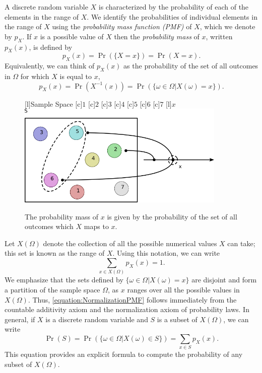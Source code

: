 A discrete random variable $X$ is characterized by the probability of each of the elements in the range of $X$.
We identify the probabilities of individual elements in the range of $X$ using the \emph{probability mass function (PMF)} of $X$, which we denote by $p_X$. 
If $x$ is a possible value of $X$ then the \emph{probability mass} of $x$, written $p_X (x)$, is defined by
\begin{equation} \label{equation:PMF}
p_X (x) = \Pr ( \{ X = x \} ) = \Pr ( X = x ) .
\end{equation}
Equivalently, we can think of $p_X (x)$ as the probability of the set of all outcomes in $\Omega$ for which $X$ is equal to $x$,
\begin{equation*}
p_X (x)
= \Pr (  X^{-1} (x)  )
= \Pr ( \{ \omega \in \Omega | X(\omega) = x \} ) .
\end{equation*}

\begin{figure}[ht]
\begin{center}
\begin{psfrags}
[l]{Sample Space}
[c]{$1$}
[c]{$2$}
[c]{$3$}
[c]{$4$}
[c]{$5$}
[c]{$6$}
[c]{$7$}
[l]{$x$}
\includegraphics[height=4.92cm]{Figures/5Chapter/pmf}
\caption{The probability mass of $x$ is given by the probability of the set of all outcomes which $X$ maps to $x$.}
\end{psfrags}
\end{center}
\end{figure}


Let $X(\Omega)$ denote the collection of all the possible numerical values $X$ can take; this set is known as the range of $X$.
Using this notation, we can write
\begin{equation} \label{equation:NormalizationPMF}
\sum_{x \in X(\Omega)} p_X(x) = 1 .
\end{equation}
We emphasize that the sets defined by $\{ \omega \in \Omega | X(\omega) = x \}$ are disjoint and form a partition of the sample space $\Omega$, as $x$ ranges over all the possible values in $X (\Omega)$.
Thus, \eqref{equation:NormalizationPMF} follows immediately from the countable additivity axiom and the normalization axiom of probability laws.
In general, if $X$ is a discrete random variable and $S$ is a subset of $X(\Omega)$, we can write
\begin{equation} \label{equation:FunctionPMF}
\Pr (S) = \Pr \left( \{ \omega \in \Omega | X(\omega) \in S \} \right) = \sum_{x \in S} p_X (x) .
\end{equation}
This equation provides an explicit formula to compute the probability of any subset of $X (\Omega)$.

